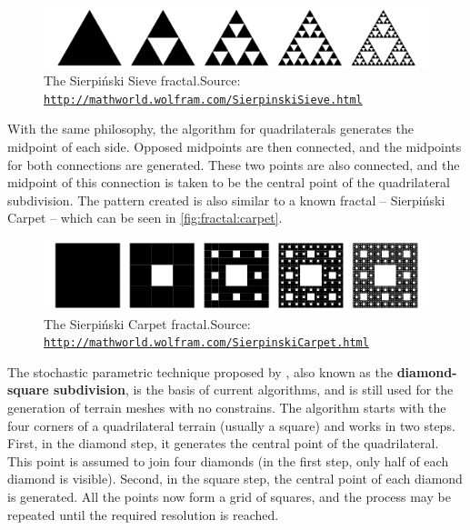 \documentclass{acmtog}
\begin{document}
\begin{figure}[!htp]
	\begin{center}
		\includegraphics[width=\columnwidth]{images/fractals/sieve.png}
	\end{center}
	\caption{The Sierpiński Sieve fractal.\newline Source: \texttt{\url{http://mathworld.wolfram.com/SierpinskiSieve.html}}}
	\label{fig:fractal:sieve}
\end{figure}

With the same philosophy, the algorithm for quadrilaterals generates the midpoint of each side. Opposed midpoints are then connected, and the midpoints for both connections are generated. These two points are also connected, and the midpoint of this connection is taken to be the central point of the quadrilateral subdivision. The pattern created is also similar to a known fractal -- Sierpiński Carpet -- which can be seen in \autoref{fig:fractal:carpet}.

\begin{figure}[!htp]
	\begin{center}
		\includegraphics[width=\columnwidth]{images/fractals/carpet.png}
	\end{center}
	\caption{The Sierpiński Carpet fractal.\newline Source: \texttt{\url{http://mathworld.wolfram.com/SierpinskiCarpet.html}}}
	\label{fig:fractal:carpet}
\end{figure}

The stochastic parametric technique proposed by \cite{Fournier82}, also known as the \textbf{diamond-square subdivision}, is the basis of current algorithms, and is still used for the generation of terrain meshes with no constrains. The algorithm starts with the four corners of a quadrilateral terrain (usually a square) and works in two steps. First, in the diamond step, it generates the central point of the quadrilateral. This point is assumed to join four diamonds (in the first step, only half of each diamond is visible). Second, in the square step, the central point of each diamond is generated. All the points now form a grid of squares, and the process may be repeated until the required resolution is reached.
\end{document}
